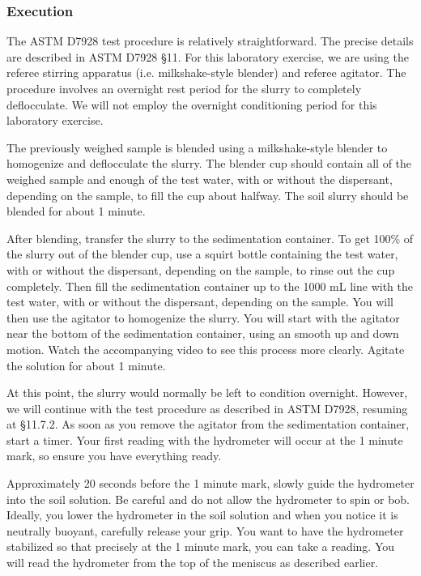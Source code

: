 \documentclass[12pt]{article}
\begin{document}
\subsubsection{Execution}
The ASTM D7928 test procedure is relatively straightforward. The precise details are described in ASTM D7928 \S11. For this laboratory exercise, we are using the referee stirring apparatus (i.e. milkshake-style blender) and referee agitator. The procedure involves an overnight rest period for the slurry to completely deflocculate. We will not employ the overnight conditioning period for this laboratory exercise.

The previously weighed sample is blended using a milkshake-style blender to homogenize and deflocculate the slurry. The blender cup should contain all of the weighed sample and enough of the test water, with or without the dispersant, depending on the sample, to fill the cup about halfway. The soil slurry should be blended for about 1 minute.

After blending, transfer the slurry to the sedimentation container. To get 100\% of the slurry out of the blender cup, use a squirt bottle containing the test water, with or without the dispersant, depending on the sample, to rinse out the cup completely. Then fill the sedimentation container up to the 1000 mL line with the test water, with or without the dispersant, depending on the sample. You will then use the agitator to homogenize the slurry. You will start with the agitator near the bottom of the sedimentation container, using an smooth up and down motion. Watch the accompanying video to see this process more clearly. Agitate the solution for about 1 minute.

At this point, the slurry would normally be left to condition overnight. However, we will continue with the test procedure as described in ASTM D7928, resuming at \S11.7.2. As soon as you remove the agitator from the sedimentation container, start a timer. Your first reading with the hydrometer will occur at the 1 minute mark, so ensure you have everything ready.

Approximately 20 seconds before the 1 minute mark, slowly guide the hydrometer into the soil solution. Be careful and do not allow the hydrometer to spin or bob. Ideally, you lower the hydrometer in the soil solution and when you notice it is neutrally buoyant, carefully release your grip. You want to have the hydrometer stabilized so that precisely at the 1 minute mark, you can take a reading. You will read the hydrometer from the top of the meniscus as described earlier.
\end{document}
